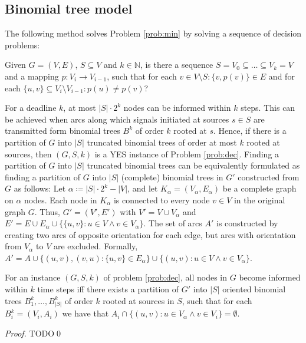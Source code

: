 \subsection{Binomial tree model}

The following method solves Problem \ref{prob:min} by solving a sequence of decision problems:
\begin{problem}
\label{prob:dec}
Given $G=(V,E)$, $S\subseteq V$ and $k\in \mathbb{N}$, is there a sequence $S=V_0\subseteq\dots\subseteq V_k=V$ and a mapping $p:V_i\to V_{i-1}$, such that for each $v\in V\setminus S:\{v,p(v)\}\in E$ and for each $\{u,v\}\subseteq V_i\setminus V_{i-1}: p(u)\neq p(v)$?
\end{problem}
For a deadline $k$, at most $|S|\cdot 2^k$ nodes can be informed within $k$ steps. 
This can be achieved when arcs along which signals initiated at sources $s\in S$ are transmitted form binomial trees $B^k$ of order $k$ rooted at $s$.
Hence, if there is a partition of $G$ into $|S|$ truncated binomial trees of order at most $k$ rooted at sources, then $(G,S,k)$ is a YES instance of Problem \ref{prob:dec}.
Finding a partition of $G$ into $|S|$ truncated binomial trees can be equivalently formulated as finding a partition of $G$ into $|S|$ (complete) binomial trees in $G'$ constructed from $G$ as follows:
Let $\alpha\coloneqq |S|\cdot 2^k-|V|$, and let $K_\alpha=(V_\alpha,E_\alpha)$ be a complete graph on $\alpha$ nodes.
Each node in $K_\alpha$ is connected to every node $v\in V$ in the original graph $G$.
Thus, $G'=(V',E')$ with $V'=V\cup V_\alpha$ and $E'=E\cup E_\alpha\cup \{\{u,v\}: u\in V \wedge v\in V_\alpha\}$.
The set of arcs $A'$ is constructed by creating two arcs of opposite orientation for each edge, but arcs with orientation from $V_\alpha$ to $V$ are excluded. 
Formally, $A'=A\cup\{(u,v),(v,u): \{u,v\}\in E_\alpha\}\cup\{(u,v):u\in V \wedge v\in V_\alpha\}$.
\begin{lemma}
\label{lem:probeq}
For an instance $(G,S,k)$ of problem \ref{prob:dec}, all nodes in $G$ become informed within $k$ time steps iff 
there exists a partition of $G'$ into $|S|$ oriented binomial trees $B^k_1,\dots,B^k_{|S|}$ of order $k$ rooted at sources in $S$,
such that for each $B^k_i=(V_i,A_i)$ we have that $A_i\cap\{(u,v):u \in V_\alpha \wedge v\in V_i\}=\emptyset$. 
\end{lemma}
\begin{proof}
TODO\qed
\end{proof}

